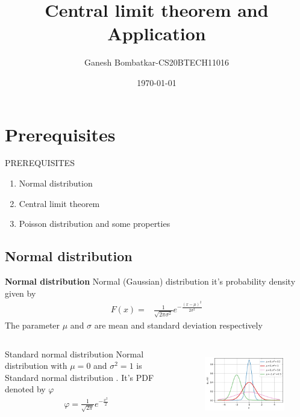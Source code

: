 \documentclass{beamer}
\title{Central limit theorem and Application}
\author{Ganesh Bombatkar-CS20BTECH11016}
\institute{}
\date{\today}
\providecommand{\brak}[1]{\ensuremath{\left(#1\right)}}
\begin{document}
\begin{frame}
\titlepage
\end{frame}

\section{Prerequisites}
\begin{frame}{PREREQUISITES}
    \begin{enumerate}
        \item Normal distribution
        \item Central limit theorem
        \item Poisson distribution and some  properties
    \end{enumerate}
\end{frame}
\subsection{Normal distribution}
\begin{frame}{\textbf{Normal distribution}}
    Normal (Gaussian) distribution it's probability density given by
    \begin{align}
        F(x)=& \frac{1}{\sqrt{2\pi \sigma^2}} e^{-\frac{{\brak{x-\mu}}^2}{2\sigma^2}}
    \end{align}
    The parameter $\mu$ and $\sigma$ are mean and standard deviation respectively
    \begin{columns}[onlytextwidth]
    \begin{block}{Standard normal distribution}
       Normal distribution with $\mu=0$ and $\sigma^2=1$ is Standard normal distribution . It's PDF denoted by $\varphi$
       \begin{align}
           \varphi = \frac{1}{\sqrt{2\pi}} e^{-\frac{x^2}{2}}
       \end{align}
    \end{block}
    \begin{figure}
        \centering
        \includegraphics[scale=0.4]{figures/norm.png}
        \label{fig:my_label}
    \end{figure}
    \end{columns}
\end{frame}
\end{document}
